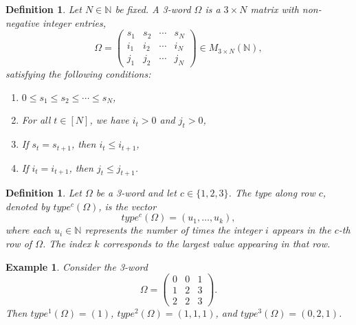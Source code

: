 \documentclass[11pt]{article}
\newtheorem{defi}[thm]{Definition}
\newtheorem{exa}[thm]{Example}
\begin{document}
\begin{defi}
Let $N \in \mathbb{N}$ be fixed. A \emph{3-word} $\Omega$ is a $3 \times N$ matrix with non-negative integer entries,
\[
\Omega = 
\begin{pmatrix}
s_1 & s_2 & \cdots & s_N \\
i_1 & i_2 & \cdots & i_N \\
j_1 & j_2 & \cdots & j_N
\end{pmatrix}
\in M_{3 \times N}(\mathbb{N}),
\]
satisfying the following conditions:
\begin{enumerate}
        \item $0 \leq s_1 \leq s_2 \leq \cdots \leq s_N$,
        \item For all $t \in [N]$, we have $i_t > 0$ and $j_t > 0$,
        \item If $s_t = s_{t+1}$, then $i_t \leq i_{t+1}$,
        \item If $i_t = i_{t+1}$, then $j_t \leq j_{t+1}$.
    \end{enumerate}
\end{defi}













\begin{defi}
    Let $\Omega$ be a 3-word and let $c \in \{1, 2, 3\}$. The \emph{type along row $c$}, denoted by $type^{c}(\Omega)$, is the vector
    $$
    type^{c}(\Omega) = (u_1, \dots, u_k),
    $$
    where each $u_i \in \mathbb{N}$ represents the number of times the integer $i$ appears in the $c$-th row of $\Omega$. The index $k$ corresponds to the largest value appearing in that row.
\end{defi}


\begin{exa}
Consider the 3-word
\[
\Omega =
\begin{pmatrix}
0 & 0 & 1 \\
1 & 2 & 3 \\
2 & 2 & 3
\end{pmatrix}.
\]
Then \( type^{1}(\Omega) = (1) \), \( type^{2}(\Omega) = (1,1,1) \), and \( type^{3}(\Omega) = (0,2,1) \).
\end{exa}
\end{document}
